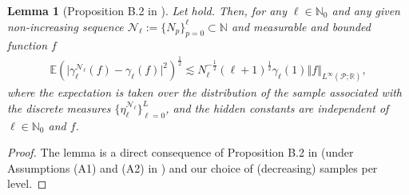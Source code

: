 \documentclass{article}
\newtheorem{remark}[theorem]{Remark}
\newtheorem{lemma}[theorem]{Lemma}
\newcommand{\ra}[1]{{\color{magenta}#1}}
\newcommand{\cA}{\mathcal{A}}
\newcommand{\cP}{\mathcal{P}}
\newcommand{\cN}{\mathcal{N}}
\newcommand{\IE}{\mathbb{E}}
\newcommand{\IN}{\mathbb{N}}
\newcommand{\IR}{\mathbb{R}}
\newcommand{\norm}[2]{{\left\Vert #2 \right\Vert}_{#1}}
\newcommand{\lp}[2]{{L}^{#1}( #2 )}
\theoremstyle{definition}
\begin{document}
\begin{lemma}[Proposition B.2 in \cite{moralMultilevelSequentialMonte2017}]
  \label{lem:convSimp}
  Let  hold. Then, for any $\ell\in\IN_0$ and any given non-increasing
  sequence $\cN_\ell:=\{N_p\}_{p=0}^\ell\subset\IN$ and measurable and bounded function $f$
  \begin{align*}
    \IE\left(\vert\gamma^{\cN_\ell}_\ell(f)-\gamma_\ell(f)\vert^2 \right)^\frac{1}{2}
    \lesssim N_\ell^{-\frac{1}{2}}(\ell+1)^{\frac{1}{2}}\gamma_\ell(1)\norm{\lp{\infty}{\cP;\IR}}{f},
  \end{align*}
  where the expectation is taken over the distribution of the sample associated
  with the discrete measures $\{\eta_\ell^{\cN_\ell}\}_{\ell=0}^L$, and the hidden constants are independent of $\ell\in\IN_0$ and $f$. 
\end{lemma}
\begin{proof}
  The lemma is a direct consequence of Proposition B.2 in \cite{moralMultilevelSequentialMonte2017}
  (under Assumptions (A1) and (A2) in \cite{beskosMultilevelSequentialMonte2017,moralMultilevelSequentialMonte2017})
  and our choice of (decreasing) samples per level.
\end{proof}

\end{document}
